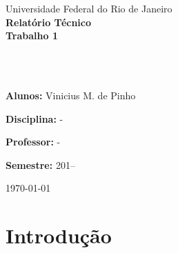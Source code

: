 \documentclass[12pt,a4paper]{article}
\author{Vinicius Mesquita}
\begin{document}
	
	

	\thispagestyle{plain}
	
	\noindent
	\begin{center}
		{\Large Universidade Federal do Rio de Janeiro \\
			\noindent
			{\Large\textbf{Relatório Técnico}}\\
			{\LARGE\textbf{Trabalho 1}}\\
			\hspace{15cm}
			\hfill \parbox{16cm}{\ ~\\ ~\\}
			\hfill \parbox{16cm}{\textbf{Alunos:} Vinicius M. de Pinho\\}
			\hfill \parbox{16cm}{\textbf{Disciplina:} -\\}
			\hfill \parbox{16cm}{\textbf{Professor:} -\\}
			\hfill \parbox{16cm}{\textbf{Semestre:}  201--\\}
			
		}\end{center}
		
		
		\begin{center}
			\today\\
		\end{center}
		




%
%

\pagebreak
\vspace*{-2.0cm}
\section{Introdução}
\end{document}
